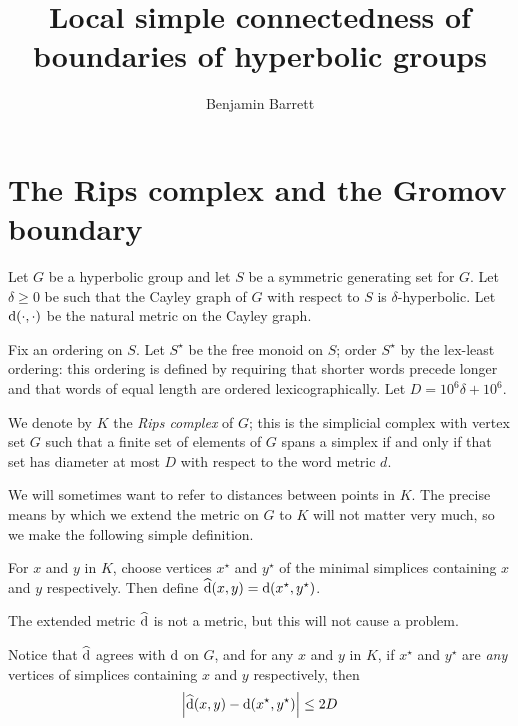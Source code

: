 \documentclass[a4paper]{article}
\title{Local simple connectedness of boundaries of hyperbolic groups}
\author{Benjamin Barrett}
\begin{document}
\maketitle


\section{The Rips complex and the Gromov boundary}\label{sec:spheres}

Let $G$ be a hyperbolic group and let $S$ be a symmetric generating set for $G$.
Let $\delta \geq 0$ be such that the Cayley graph of $G$ with respect to $S$ is 
$\delta$-hyperbolic. Let $\operatorname{d}(\cdot, \cdot)$ be the natural metric on the
Cayley graph.

Fix an ordering on $S$. Let $S^\star$ be the free monoid on 
$S$; order $S^\star$ by the lex-least ordering: this ordering is defined by 
requiring that shorter words precede longer and that words of equal length are 
ordered lexicographically. Let $D = 10^6\delta + 10^6$.

\begin{definition}
  We denote by $K$ the \emph{Rips complex} of $G$; this is the simplicial
  complex with vertex set $G$ such that a finite set of elements of $G$ spans a
  simplex if and only if that set has diameter at most $D$ with respect to the
  word metric $d$.
\end{definition}

We will sometimes want to refer to distances between points in $K$. The
precise means by which we extend the metric on $G$ to $K$ will not matter
very much, so we make the following simple definition.

\begin{definition}
  For $x$ and $y$ in $K$, choose vertices $x^\star$ and $y^\star$ of the
  minimal simplices containing $x$ and $y$ respectively. Then define
  $\operatorname{\widehat{d}}(x,y) = \operatorname{d}(x^\star, y^\star)$.
\end{definition}

\begin{remark}\label{rem:dist_vs_newdist}
  The extended metric $\operatorname{\widehat{d}}$ is not a metric, but this will not cause a
  problem.

  Notice that $\operatorname{\widehat{d}}$ agrees with $\operatorname{d}$ on $G$, and for any $x$ and $y$ in
  $K$, if $x^\star$ and $y^\star$ are \emph{any} vertices of simplices
  containing $x$ and $y$ respectively, then
  \begin{equation*}
    \left|\operatorname{\widehat{d}}(x,y) - \operatorname{d}(x^\star, y^\star)\right| \leq 2D
  \end{equation*}
\end{remark}
\end{document}
